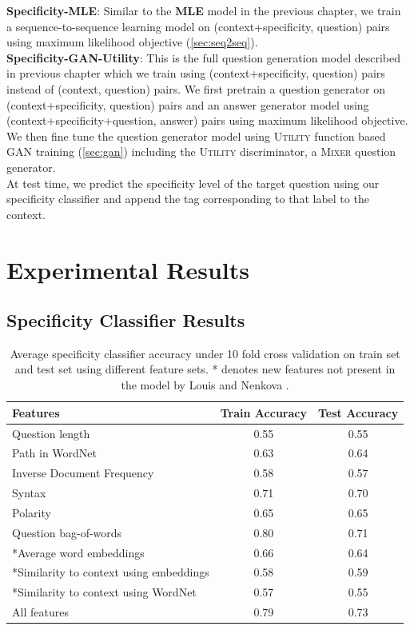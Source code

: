 \documentclass[11pt,a4paper]{article}
\newcommand{\mixer}{\textsc{Mixer}\xspace}
\newcommand{\utility}{\textsc{Utility}\xspace}
\begin{document}
\noindent \textbf{Specificity-MLE}: Similar to the \textbf{MLE} model in the previous chapter, we train a sequence-to-sequence learning model \cite{sutskever2014sequence} on (context+specificity, question) pairs using maximum likelihood objective (\autoref{sec:seq2seq}). \\

\noindent \textbf{Specificity-GAN-Utility}: This is the full question generation model described in previous chapter which we train using (context+specificity, question) pairs instead of (context, question) pairs. 
We first pretrain a question generator on (context+specificity, question) pairs and an answer generator model using (context+specificity+question, answer) pairs using maximum likelihood objective. 
We then fine tune the question generator model using \utility function based GAN training (\autoref{sec:gan}) including the \utility discriminator, a \mixer question generator. \\
 
At test time, we predict the specificity level of the target question using our specificity classifier and append the tag corresponding to that label to the context. 

\section{Experimental Results}

\subsection{Specificity Classifier Results}

\begin{table}[t]
\centering
\begin{tabular}{lcc}
\toprule
Features & Train Accuracy & Test Accuracy \\
\midrule
Question length & 0.55 & 0.55 \\
Path in WordNet & 0.63 & 0.64 \\
Inverse Document Frequency & 0.58 & 0.57 \\
Syntax & 0.71 & 0.70 \\
Polarity & 0.65 & 0.65 \\
Question bag-of-words & 0.80 & 0.71 \\
*Average word embeddings & 0.66 & 0.64 \\
*Similarity to context using embeddings & 0.58 & 0.59 \\
*Similarity to context using WordNet & 0.57 & 0.55 \\
All features &  0.79 &  0.73 \\
\bottomrule
\end{tabular}
\caption{Average specificity classifier accuracy under 10 fold cross validation on train set and test set using different feature sets. 
* denotes new features not present in the model by Louis and Nenkova \cite{louis2011automatic}.}\label{tab:specificity-classifier-results}
\end{table}
\end{document}
